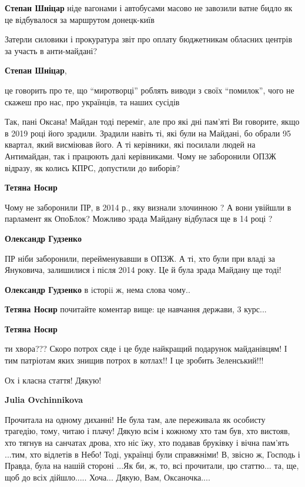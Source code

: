 \begin{itemize}
\begin{itemize}
\textbf{Степан Шніцар} ніде вагонами і автобусами масово не завозили ватне бидло як це відбувалося за маршрутом донецк-київ

Затерли силовики і прокуратура звіт про оплату бюджетникам обласних центрів за участь в анти-майдані?

\textbf{Степан Шніцар}, 

це говорить про те, що \enquote{миротворці} роблять виводи з своїх
\enquote{помилок}, чого не скажеш про нас, про українців, та наших сусідів

\end{itemize} %


Так, пані Оксана! Майдан тоді переміг, але про які дні пам'яті Ви говорите,
якщо в 2019 році його зрадили. Зрадили навіть ті, які були на Майдані, бо
обрали 95 квартал, який висміював його. А ті керівники, які посилали людей на
Антимайдан, так і працюють далі керівниками. Чому не заборонили ОПЗЖ відразу,
як колись КПРС, допустили до виборів?

\begin{itemize} %
\textbf{Тетяна Носир} 

Чому не заборонили ПР, в 2014 р., яку визнали злочинною ? А вони увійшли в
парламент як ОпоБлок? Можливо зрада Майдану відбулася ще в 14 році ?

\textbf{Олександр Гудзенко} 

ПР ніби заборонили, перейменувавши в ОПЗЖ. А ті, хто були при владі за
Януковича, залишилися і після 2014 року. Це й була зрада Майдану ще тоді!

\textbf{Олександр Гудзенко} в iсторii ж, нема слова чому..

\textbf{Тетяна Носир} почитайте коментар вище: це навчання держави, 3 курс...

\textbf{Тетяна Носир} 

ти хвора??? Скоро потрох сяде і це буде найкращий подарунок майданівцям! І тим
патріотам яких знищив потрох в котлах!! І це зробить Зеленський!!!

\end{itemize} %

Ох і класна стаття! Дякую!

\textbf{Julia Ovchinnikova} 

Прочитала на одному диханні! Не була там, але переживала як особисту
трагедію, тому, читаю і плачу! Дякую всім і кожному хто там був, хто вистояв, хто
тягнув на санчатах дрова, хто ніс їжу, хто подавав бруківку і вічна пам'ять
...тим, хто відлетів в Небо! Тоді, українці були справжніми! В, звісно ж, Господь
і Правда, була на нашій стороні ...Як би, ж, то, всі прочитали, цю
статтю... та, ще, щоб до всіх дійшло..... Хоча... Дякую, Вам, Оксаночка....


\end{itemize}
